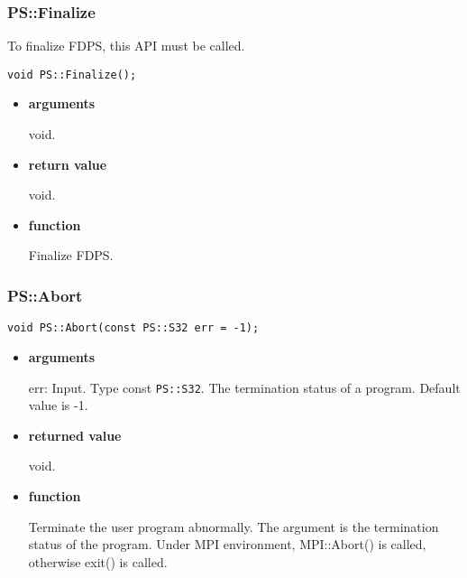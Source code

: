 \subsubsection{PS::Finalize}


To finalize FDPS, this API must be called.

\begin{screen}
\begin{verbatim}
void PS::Finalize();
\end{verbatim}
\end{screen}

\begin{itemize}

\item {\bf arguments}

  void.

\item {\bf return value}

  void.

\item {\bf function}

Finalize FDPS.

\end{itemize}

\subsubsection{PS::Abort}

\begin{screen}
\begin{verbatim}
void PS::Abort(const PS::S32 err = -1);
\end{verbatim}
\end{screen}

\begin{itemize}

\item {\bf arguments}

err: Input. Type const {\tt PS::S32}. The termination status of a
program. Default value is -1.

\item {\bf returned value}

  void.

\item {\bf function}

  Terminate the user program abnormally. The argument is the termination
  status of the program. Under MPI environment, MPI::Abort() is called,
  otherwise exit() is called.
  

\end{itemize}

